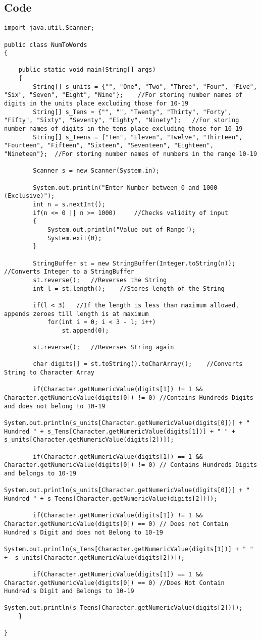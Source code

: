 \documentclass[ProgramminAssignment.tex]{subfiles}
\begin{document}
\subsection{Code}
\begin{lstlisting}
import java.util.Scanner;

public class NumToWords
{

	public static void main(String[] args)
	{
		String[] s_units = {"", "One", "Two", "Three", "Four", "Five", "Six", "Seven", "Eight", "Nine"};	//For storing number names of digits in the units place excluding those for 10-19
		String[] s_Tens = {"", "", "Twenty", "Thirty", "Forty", "Fifty", "Sixty", "Seventy", "Eighty", "Ninety"};	//For storing number names of digits in the tens place excluding those for 10-19
		String[] s_Teens = {"Ten", "Eleven", "Twelve", "Thirteen", "Fourteen", "Fifteen", "Sixteen", "Seventeen", "Eighteen", "Nineteen"};	//For storing number names of numbers in the range 10-19
		
		Scanner s = new Scanner(System.in);
		
		System.out.println("Enter Number between 0 and 1000 (Exclusive)");
		int n = s.nextInt();
		if(n <= 0 || n >= 1000)		//Checks validity of input
		{
			System.out.println("Value out of Range");
			System.exit(0);
		}
		
		StringBuffer st = new StringBuffer(Integer.toString(n));	//Converts Integer to a StringBuffer
		st.reverse();	//Reverses the String
		int l = st.length();	//Stores length of the String
		
		if(l < 3)	//If the length is less than maximum allowed, appends zeroes till length is at maximum
			for(int i = 0; i < 3 - l; i++)
				st.append(0);
		
		st.reverse();	//Reverses String again
		
		char digits[] = st.toString().toCharArray();	//Converts String to Character Array
		
		if(Character.getNumericValue(digits[1]) != 1 && Character.getNumericValue(digits[0]) != 0) //Contains Hundreds Digits and does not belong to 10-19
			System.out.println(s_units[Character.getNumericValue(digits[0])] + " Hundred " + s_Tens[Character.getNumericValue(digits[1])] + " " + s_units[Character.getNumericValue(digits[2])]);
		
		if(Character.getNumericValue(digits[1]) == 1 && Character.getNumericValue(digits[0]) != 0) // Contains Hundreds Digits and belongs to 10-19
			System.out.println(s_units[Character.getNumericValue(digits[0])] + " Hundred " + s_Teens[Character.getNumericValue(digits[2])]);
		
		if(Character.getNumericValue(digits[1]) != 1 && Character.getNumericValue(digits[0]) == 0) // Does not Contain Hundred's Digit and does not Belong to 10-19
			System.out.println(s_Tens[Character.getNumericValue(digits[1])] + " " +  s_units[Character.getNumericValue(digits[2])]);
		
		if(Character.getNumericValue(digits[1]) == 1 && Character.getNumericValue(digits[0]) == 0) //Does Not Contain Hundred's Digit and Belongs to 10-19
			System.out.println(s_Teens[Character.getNumericValue(digits[2])]);
	}

}

\end{lstlisting}
\end{document}
